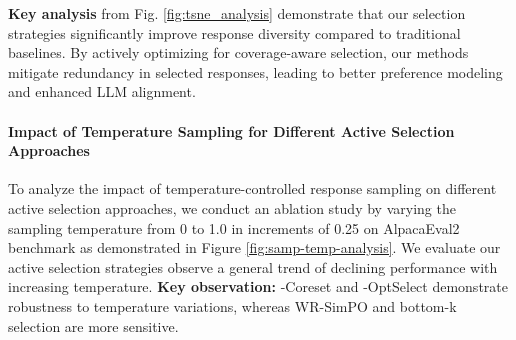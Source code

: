 



\vspace{-0.1in}
\textbf{Key analysis} from Fig. \ref{fig:tsne_analysis} demonstrate that our selection strategies significantly improve response diversity compared to traditional baselines. By actively optimizing for coverage-aware selection, our methods mitigate redundancy in selected responses, leading to better preference modeling and enhanced LLM alignment.

\vspace{-0.1in}
\paragraph{Impact of Temperature Sampling for Different Active Selection Approaches}
To analyze the impact of temperature-controlled response sampling on different active selection approaches, we conduct an ablation study by varying the sampling temperature from 0 to 1.0 in increments of 0.25 on AlpacaEval2 benchmark as demonstrated in Figure \ref{fig:samp-temp-analysis}. We evaluate our active selection strategies observe a general trend of declining performance with increasing temperature. \textbf{Key observation:} \ampo-Coreset and \ampo-OptSelect demonstrate robustness to temperature variations, whereas WR-SimPO and bottom-k selection are more sensitive.

